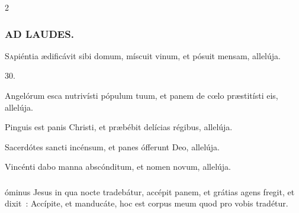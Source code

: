 \documentclass[9pt,twoside]{extarticle}
\begin{document}
\begin{multicols}{2}
{\subsubsection*{\center \textsc{AD LAUDES.}}
\begin{center}\end{center}
\lettrine{S}apiéntia ædificávit sibi domum, míscuit vinum, et pósuit mensam, allelúja.

\begin{tightlist}{}
\item {} 30.
\item {} Angelórum esca nutrivísti pópulum tuum, et panem de cœlo præstitísti eis, allelúja.
\item {} Pinguis est panis Christi, et præbébit delícias régibus, allelúja.
\item {} Sacerdótes sancti incénsum, et panes ófferunt Deo, allelúja.
\item {} Vincénti dabo manna abscónditum, et nomen novum, allelúja.
\end{tightlist}

\subsubsection*{}
óminus Jesus in qua nocte tradebátur, accépit panem, et grátias agens fregit, et dixit~: Accípite, et manducáte, hoc est corpus meum quod pro vobis tradétur.

}
\end{multicols}
\end{document}

